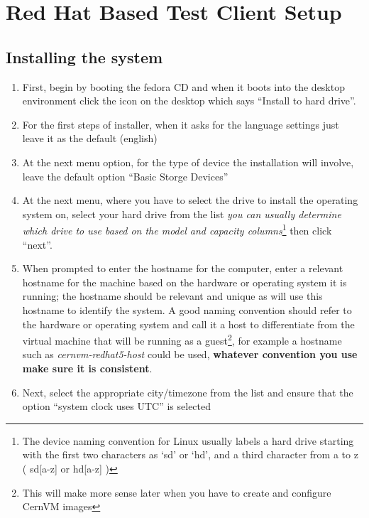 \section{Red Hat Based Test Client Setup}
\subsection{Installing the system}
\label{sec:rhinstall}
\flushleft
\begin{enumerate}
\item First, begin by booting the fedora CD and when it boots into the desktop environment click the icon on the desktop which says
	  ``Install to hard drive''.
	  
\item	For the first steps of installer, when it asks for the language settings just leave it as the default (english)

\item 	At the next menu option, for the type of device the installation will involve, leave the default option ``Basic Storge Devices''

\item 	At the next menu, where you have to select the drive to install the operating system on, select your hard drive from the list
	  	\emph{you can usually determine which drive to use based on the model and capacity columns}\footnote{ The device naming convention
	  	for Linux usually labels a hard drive starting with the first two characters as `sd' or `hd', and a third character from a to z 
	  	( sd[a-z] or hd[a-z] )} then click ``next''.
	  
\item 	When prompted to enter the hostname for the computer, enter a relevant hostname for the machine based on the hardware or operating
		system it is running; the hostname should be relevant and unique as \tapper will use this hostname to identify the system. A good naming
		convention should refer to the hardware or operating system and call it a host to differentiate from the virtual machine that will be
		running as a guest\footnote{This will make more sense later when you have to create and configure CernVM images}, for example a hostname such
		as \emph{cernvm-redhat5-host} could be used, {\bf whatever convention you use make sure it is consistent}.
		
\item	Next, select the appropriate city/timezone from the list and ensure that the option ``system clock uses UTC'' is selected


\end{enumerate}
